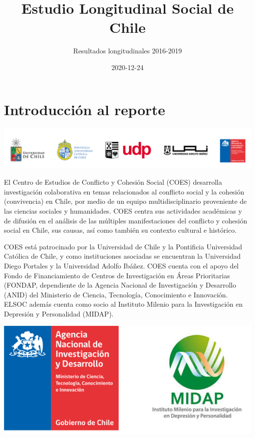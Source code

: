 \documentclass[
  12pt,
]{book}
\title{Estudio Longitudinal Social de Chile}
\subtitle{Resultados longitudinales 2016-2019}
\author{}
\date{\vspace{-2.5em}2020-12-24}
\begin{document}
\maketitle

	

{
\setcounter{tocdepth}{1}
\tableofcontents
}
\listoftables
\listoffigures
{}
\hypertarget{introducciuxf3n-al-reporte}{%
\chapter{Introducción al reporte}\label{introducciuxf3n-al-reporte}}

\begin{center}\includegraphics[width=0.7\linewidth]{inputs/images/logos} \end{center}

El Centro de Estudios de Conflicto y Cohesión Social (COES) desarrolla investigación colaborativa en temas relacionados al conflicto social y la cohesión (convivencia) en Chile, por medio de un equipo multidisciplinario proveniente de las ciencias sociales y humanidades. COES centra sus actividades académicas y de difusión en el análisis de las múltiples manifestaciones del conflicto y cohesión social en Chile, sus causas, así como también su contexto cultural e histórico.

COES está patrocinado por la Universidad de Chile y la Pontificia Universidad Católica de Chile, y como instituciones asociadas se encuentran la Universidad Diego Portales y la Universidad Adolfo Ibáñez. COES cuenta con el apoyo del Fondo de Financiamiento de Centros de Investigación en Áreas Prioritarias (FONDAP, dependiente de la Agencia Nacional de Investigación y Desarrollo (ANID) del Ministerio de Ciencia, Tecnología, Conocimiento e Innovación. ELSOC además cuenta como socio al Instituto Milenio para la Investigación en Depresión y Personalidad (MIDAP).

\begin{center}\includegraphics[width=0.3\linewidth]{inputs/images/anid_midap} \end{center}
\end{document}
